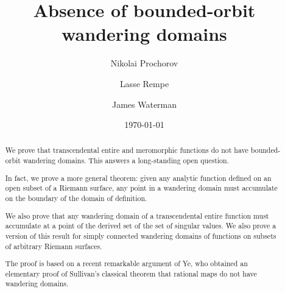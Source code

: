 \documentclass[12pt,a4paper,reqno]{amsart}
\theoremstyle{plain}
\theoremstyle{definition}
\theoremstyle{remark}
\numberwithin{equation}{section}
\newcommand{\lr}[1]{{\color{magenta} #1}}
\begin{document}
\title{Absence of bounded-orbit wandering domains}
\author[N. Prochorov]{Nikolai Prochorov}

\address{\noindent Dept. of Mathematics \\ The University of Manchester \\ Manchester \\ M13 9PL \\ UK}

\author[L. Rempe]{Lasse Rempe} 
\address{\noindent Dept. of Mathematics \\ The University of Manchester \\ Manchester \\ M13 9PL \\ UK}

\author[J. Waterman]{James Waterman}
\address{Center for Computing Sciences\\ Bowie \\ MD 20715 \\ USA}



\date{\today}


\begin{abstract}
 We prove that transcendental \lr{entire and meromorphic}
  functions do not have bounded-orbit wandering domains. This
  answers a long-standing open question. \lr{In fact,
  we prove a more general theorem: given any analytic function defined on an open subset
  of a Riemann surface, any point in a wandering domain must accumulate on the boundary of
  the domain of definition. 

  We also prove that any wandering domain of a transcendental entire function must accumulate at a 
   point of the derived set of the set of singular values. 
   We also prove a version of this result for simply connected wandering domains
   of functions on subsets of arbitrary Riemann surfaces.}

 The proof is based on a recent remarkable argument of Ye, who obtained an elementary proof of
  Sullivan's classical theorem that rational maps do not have wandering domains. 
\end{abstract}
\end{document}
